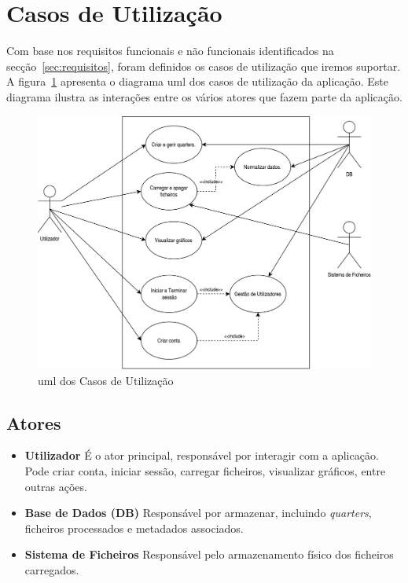 \section{Casos de Utilização}
\label{ch:casosUtilizacao}

Com base nos requisitos funcionais e não funcionais identificados na secção~\ref{sec:requisitos}, foram definidos os casos de utilização que iremos suportar. A figura~\ref{fig:umlCasosUtilizacao} apresenta o diagrama \gls{uml} dos casos de utilização da aplicação. Este diagrama ilustra as interações entre os vários atores que fazem parte da aplicação.

\begin{figure}[h]
\centering
\includegraphics[max width=\textwidth]{./img/usecase_uml}
\caption{\gls{uml} dos Casos de Utilização}
\label{fig:umlCasosUtilizacao}
\end{figure}

\subsection{Atores}
\begin{itemize}
    \item \textbf{Utilizador} É o ator principal, responsável por interagir com a aplicação. Pode criar conta, iniciar sessão, carregar ficheiros, visualizar gráficos, entre outras ações.
    \item \textbf{Base de Dados (DB)} Responsável por armazenar, incluindo \textit{quarters}, ficheiros processados e metadados associados.
    \item \textbf{Sistema de Ficheiros} Responsável pelo armazenamento físico dos ficheiros carregados.
\end{itemize}

